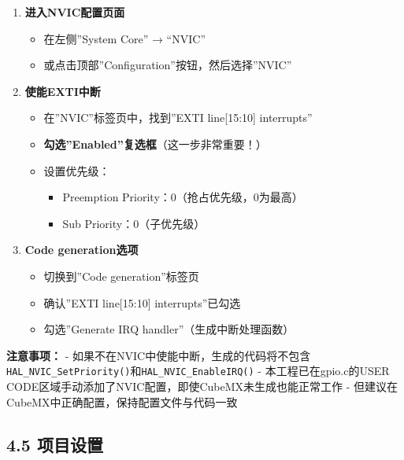 \documentclass[
  chinese,
  UTF8,
  oneside,
  openany]{ctexbook}
\providecommand{\tightlist}{%
  \setlength{\itemsep}{0pt}\setlength{\parskip}{0pt}}
\begin{document}
\begin{enumerate}
\def\labelenumi{\arabic{enumi}.}
\tightlist
\item
  \textbf{进入NVIC配置页面}

  \begin{itemize}
  \tightlist
  \item
    在左侧''System Core'' → ``NVIC''
  \item
    或点击顶部''Configuration''按钮，然后选择''NVIC''
  \end{itemize}
\item
  \textbf{使能EXTI中断}

  \begin{itemize}
  \tightlist
  \item
    在''NVIC''标签页中，找到''EXTI line{[}15:10{]} interrupts''
  \item
    \textbf{勾选''Enabled''复选框}（这一步非常重要！）
  \item
    设置优先级：

    \begin{itemize}
    \tightlist
    \item
      Preemption Priority：0（抢占优先级，0为最高）
    \item
      Sub Priority：0（子优先级）
    \end{itemize}
  \end{itemize}
\item
  \textbf{Code generation选项}

  \begin{itemize}
  \tightlist
  \item
    切换到''Code generation''标签页
  \item
    确认''EXTI line{[}15:10{]} interrupts''已勾选
  \item
    勾选''Generate IRQ handler''（生成中断处理函数）
  \end{itemize}
\end{enumerate}

\textbf{注意事项：} -
如果不在NVIC中使能中断，生成的代码将不包含\texttt{HAL\_NVIC\_SetPriority()}和\texttt{HAL\_NVIC\_EnableIRQ()}
- 本工程已在gpio.c的USER
CODE区域手动添加了NVIC配置，即使CubeMX未生成也能正常工作 -
但建议在CubeMX中正确配置，保持配置文件与代码一致

\subsection{4.5 项目设置}\label{ux9879ux76eeux8bbeux7f6e}
\end{document}
